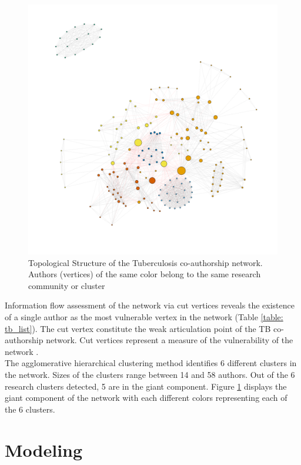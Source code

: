 \begin{figure}[h!]
\centering
\hspace{1.5cm}
\includegraphics[scale=0.35]{Chapters/tb/tbnet}
\caption{Topological Structure of the Tuberculosis co-authorship network. Authors (vertices) of the same color belong to the same research community or cluster}
\label{tb_fig5}
\end{figure}

Information flow assessment of the network via cut vertices reveals the existence of a single author as the most vulnerable vertex in the network (Table \ref{table: tb_list}). The cut vertex constitute the weak articulation point of the TB co-authorship network. Cut vertices represent a measure of the vulnerability of the network \cite{kolaczyk_statistical_2014}.\\
The agglomerative hierarchical clustering method identifies 6 different clusters in the network. Sizes of the clusters range between 14 and 58 authors. Out of the 6 research clusters detected, 5 are in the giant component. Figure \ref{tb_fig5} displays the giant component of the network with each different colors representing each of the 6 clusters. %

\section{Modeling}
